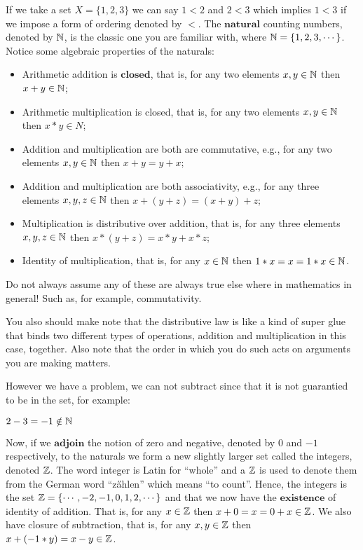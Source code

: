 If we take a set $X = \{ 1, 2 , 3 \}$ we can say $1<2$ and $2<3$ which implies $1<3$ if we impose a form of ordering denoted by $<$.
The $\textbf{natural}$ counting numbers, denoted by $\mathbb{N}$, is the classic one you are familiar with, where $\mathbb{N} = \{ 1, 2, 3, \cdots \}$.
Notice some algebraic properties of the naturals:
\begin{itemize}
 \item Arithmetic addition is $\textbf{closed}$, that is, for any two elements $x,y \in \mathbb{N}$ then $x+y \in \mathbb{N}$;
 \item Arithmetic multiplication is closed, that is, for any two elements $x,y \in \mathbb{N}$ then $x*y \in N$;
 \item Addition and multiplication are both are commutative, e.g., for any two elements $x,y \in \mathbb{N}$ then $x+y = y+x$;
 \item Addition and multiplication are both associativity, e.g., for any three elements $x,y,z \in \mathbb{N}$ then $x+(y+z) = (x+y)+z$;
 \item Multiplication is distributive over addition, that is, for any three elements $x,y,z \in \mathbb{N}$ then $x*(y + z) = x*y + x*z$;
 \item Identity of multiplication, that is, for any $x \in \mathbb{N}$ then $1*x = x = 1*x \in \mathbb{N}$.
\end{itemize}

\begin{note}
 Do not always assume any of these are always true else where in mathematics in general! Such as, for example, commutativity.
\end{note}

You also should make note that the distributive law is like a kind of super glue that binds two different types of operations,
addition and multiplication in this case, together. Also note that the order in which you do such acts on arguments you are
making matters.

However we have a problem, we can not subtract since that it is not guarantied to be in the set, for example:
\begin{exmp}
 $2 - 3 = -1 \notin \mathbb{N}$
\end{exmp}

Now, if we $\textbf{adjoin}$ the notion of zero and negative, denoted by $0$ and $-1$ respectively,
to the naturals we form a new slightly larger set called the integers, denoted $\mathbb{Z}$.
The word integer is Latin for ``whole'' and a $\mathbb{Z}$ is used to denote them from the German word ``z\H{a}hlen'' which means ``to count''.
Hence, the integers is the set $\mathbb{Z} = \{ \cdots, -2, -1, 0, 1, 2, \cdots \}$ and that we now have the $\textbf{existence}$
of identity of addition. That is, for any $x \in \mathbb{Z}$ then $x + 0 = x = 0 + x \in \mathbb{Z}$. We also have closure of subtraction, that is,
for any $x,y \in \mathbb{Z}$ then $x + (-1*y) = x - y \in \mathbb{Z}$.

